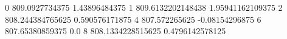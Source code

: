 0 809.0927734375 1.43896484375
1 809.6132202148438 1.95941162109375
2 808.244384765625 0.590576171875
4 807.572265625 -0.08154296875
6 807.65380859375 0.0
8 808.1334228515625 0.4796142578125
